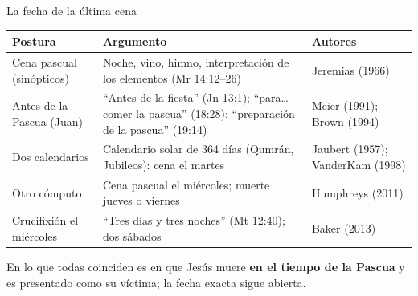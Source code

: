 \documentclass[hyperref={bookmarks=false},aspectratio=169]{beamer}
\newcommand{\destacar}[1]{\textbf{\textcolor{tierraroja}{#1}}}
\begin{document}
\begin{frame}{La fecha de la última cena}
\scriptsize\renewcommand{\arraystretch}{1.12}
\begin{tabular}{@{}L{3.0cm}L{6.0cm}L{3.0cm}@{}}
\toprule
\textbf{Postura} & \textbf{Argumento} & \textbf{Autores} \\ \midrule
Cena pascual (sinópticos) & Noche, vino, himno, interpretación de los elementos (Mr 14:12--26) & Jeremias (1966) \\
Antes de la Pascua (Juan) & ``Antes de la fiesta'' (Jn 13:1); ``para\ldots{} comer la pascua'' (18:28); ``preparación de la pascua'' (19:14) & Meier (1991); Brown (1994) \\
Dos calendarios & Calendario solar de 364 días (Qumrán, Jubileos): cena el martes & Jaubert (1957); VanderKam (1998) \\
Otro cómputo & Cena pascual el miércoles; muerte jueves o viernes & Humphreys (2011) \\
Crucifixión el miércoles & ``Tres días y tres noches'' (Mt 12:40); dos sábados & Baker (2013) \\
\bottomrule
\end{tabular}\par\medskip
\small\RaggedRight En lo que todas coinciden es en que Jesús muere \destacar{en el tiempo de la Pascua} y es presentado como su víctima; la fecha exacta sigue abierta.
\end{frame}
\end{document}
